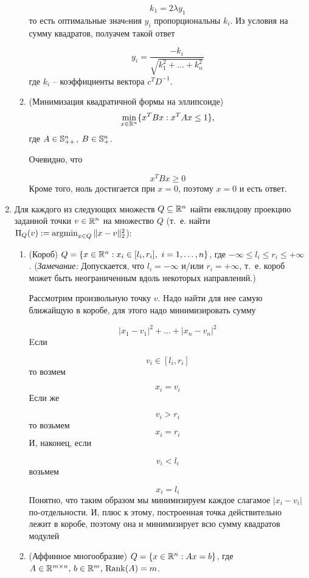 \documentclass{article}
\begin{document}
\begin{enumerate}[label=\textbf{\arabic*}, leftmargin=0em]
\begin{enumerate}
$$
k_1 = 2\lambda y_1
$$
то есть оптимальные значeния $y_i$ пропорциональны $k_i$. Из условия на сумму квадратов, полуачем такой ответ

$$
y_i = \displaystyle\frac{-k_i}{\sqrt{k_1^2 + \ldots + k_n^2}}
$$
где $k_i$ -- коэффициенты вектора $c^TD^{-1}$.
\item (Минимизация квадратичной формы на эллипсоиде)
\begin{equation}
\min_{x \in \R^n} \{ x^T B x : x^T A x \leq 1 \},
\end{equation}
где $A \in \S^n_{++}$, $B \in \S^n_+$.

Очевидно, что

$$
x^T B x \geq 0
$$
Кроме того, ноль достигается при $x = 0$, поэтому $x = 0$ и есть ответ.

\end{enumerate}

\item Для каждого из следующих множеств $Q \subseteq \R^n$ найти евклидову проекцию заданной точки $v \in \R^n$ на множество $Q$ (т.~е. найти $\Proj_Q(v) := \argmin_{x \in Q} \| x - v \|_2^2$):
\begin{enumerate}
\item (Короб) $Q = \{ x \in \R^n : x_i \in [l_i, r_i], \ i = 1, \dots, n \}$, где $-\infty \leq l_i \leq r_i \leq +\infty$. (\emph{Замечание:} Допускается, что $l_i = -\infty$ и/или $r_i = +\infty$, т.~е. короб может быть неограниченным вдоль некоторых направлений.)

Рассмотрим произвольную точку $v$. Надо найти для нее самую ближайщую в коробе, для этого надо минимизировать сумму

$$
|x_1 - v_1|^2 + \ldots + |x_n - v_n|^2
$$
Eсли

$$
v_i \in [l_i, r_i]
$$
то возмем

$$
x_i = v_i
$$
Если же

$$
v_i > r_i
$$
то возьмем
$$
x_i = r_i
$$
И, наконец, если

$$
v_i < l_i
$$
возьмем

$$
x_i = l_i
$$
Понятно, что таким образом мы минимизируем каждое слагамое $|x_i - v_i|$ по-отдельности. И, плюс к этому, построенная точка действительно лежит в коробе, поэтому она и минимизирует всю сумму квадратов модулей

\item (Аффинное многообразие) $Q = \{ x \in \R^n : A x = b \}$, где $A \in \R^{m \times n}, \, b \in \R^m, \, \Rank(A) = m$.


\end{enumerate}
\end{enumerate}
\end{document}
